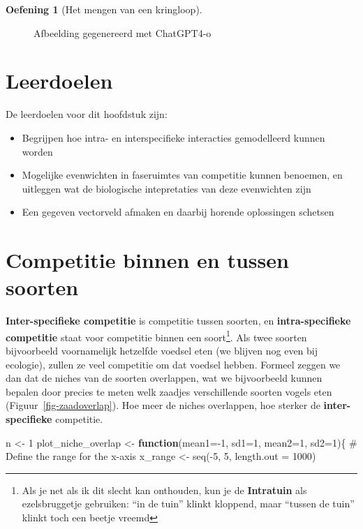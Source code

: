 \documentclass[
  a4paper,
]{scrbook}
\newenvironment{Shaded}{\begin{snugshade}}{\end{snugshade}}
\newcommand{\AttributeTok}[1]{\textcolor[rgb]{0.40,0.45,0.13}{#1}}
\newcommand{\CommentTok}[1]{\textcolor[rgb]{0.37,0.37,0.37}{#1}}
\newcommand{\ControlFlowTok}[1]{\textcolor[rgb]{0.00,0.23,0.31}{\textbf{#1}}}
\newcommand{\DecValTok}[1]{\textcolor[rgb]{0.68,0.00,0.00}{#1}}
\newcommand{\FunctionTok}[1]{\textcolor[rgb]{0.28,0.35,0.67}{#1}}
\newcommand{\NormalTok}[1]{\textcolor[rgb]{0.00,0.23,0.31}{#1}}
\newcommand{\OtherTok}[1]{\textcolor[rgb]{0.00,0.23,0.31}{#1}}
\newcommand{\SpecialCharTok}[1]{\textcolor[rgb]{0.37,0.37,0.37}{#1}}
\providecommand{\tightlist}{%
  \setlength{\itemsep}{0pt}\setlength{\parskip}{0pt}}\usepackage{longtable,booktabs,array}
\theoremstyle{definition}
\newtheorem{exercise}{Oefening}[chapter]
\theoremstyle{remark}
\begin{document}
\begin{exercise}[Het mengen van een
kringloop]
\begin{figure}[H]
\caption{Afbeelding gegenereerd met ChatGPT4-o}

\end{figure}%

\section{Leerdoelen}\label{leerdoelen-8}

De leerdoelen voor dit hoofdstuk zijn:

\begin{itemize}
\tightlist
\item
  Begrijpen hoe intra- en interspecifieke interacties gemodelleerd
  kunnen worden
\item
  Mogelijke evenwichten in faseruimtes van competitie kunnen benoemen,
  en uitleggen wat de biologische intepretaties van deze evenwichten
  zijn
\item
  Een gegeven vectorveld afmaken en daarbij horende oplossingen schetsen
\end{itemize}

\section{Competitie binnen en tussen
soorten}\label{competitie-binnen-en-tussen-soorten}

\textbf{Inter-specifieke competitie} is competitie tussen soorten, en
\textbf{intra-specifieke competitie} staat voor competitie binnen een
soort\footnote{Als je net als ik dit slecht kan onthouden, kun je de
  \textbf{Intratuin} als ezelsbruggetje gebruiken: ``in de tuin'' klinkt
  kloppend, maar ``tussen de tuin'' klinkt toch een beetje vreemd}. Als
twee soorten bijvoorbeeld voornamelijk hetzelfde voedsel eten (we
blijven nog even bij ecologie), zullen ze veel competitie om dat voedsel
hebben. Formeel zeggen we dan dat de niches van de soorten overlappen,
wat we bijvoorbeeld kunnen bepalen door precies te meten welk zaadjes
verschillende soorten vogels eten (Figuur~\ref{fig-zaadoverlap}). Hoe
meer de niches overlappen, hoe sterker de \textbf{inter-specifieke}
competitie.

\begin{Shaded}
\begin{Highlighting}[]
\NormalTok{n }\OtherTok{\textless{}{-}} \DecValTok{1}
\NormalTok{plot\_niche\_overlap }\OtherTok{\textless{}{-}} \ControlFlowTok{function}\NormalTok{(}\AttributeTok{mean1=}\SpecialCharTok{{-}}\DecValTok{1}\NormalTok{, }\AttributeTok{sd1=}\DecValTok{1}\NormalTok{, }\AttributeTok{mean2=}\DecValTok{1}\NormalTok{, }\AttributeTok{sd2=}\DecValTok{1}\NormalTok{)\{}
  \CommentTok{\# Define the range for the x{-}axis}
\NormalTok{  x\_range }\OtherTok{\textless{}{-}} \FunctionTok{seq}\NormalTok{(}\SpecialCharTok{{-}}\DecValTok{5}\NormalTok{, }\DecValTok{5}\NormalTok{, }\AttributeTok{length.out =} \DecValTok{1000}\NormalTok{)}
  

\end{Highlighting}
\end{Shaded}
\end{exercise}
\end{document}
